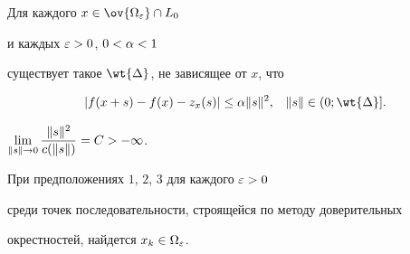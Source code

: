 \begin{assmp}


Для каждого $x \in \ov{\Omega_{\e}} \cap L_0$


и каждых $\varepsilon>0$, $0<\alpha<1$


существует такое $\wt{\Delta}$, не зависящее от $x$, что


$$


|f(x+s) - f(x) - z_x (s)| \leq \ga \|s\|^2,


\;\;\; \|s\| \in (0;\wt{\Delta}].


$$


\end{assmp}





\begin{assmp}


$\lim\limits_{\|s\| \rar 0}


\displaystyle{\frac{\|s\|^2}{c(\|s\|)}}=C > -\infty$.


\end{assmp}





\begin{thms} \label{tt1} При предположениях $1$, $2$, $3$ для каждого $\varepsilon>0$


среди точек последовательности, строящейся по методу доверительных 


окрестностей, найдется $x_k \in \Omega_{\varepsilon}$.


\end{thms}





